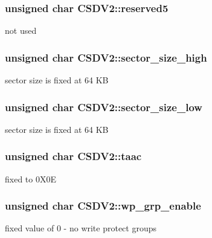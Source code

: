 \subsubsection[{\texorpdfstring{reserved5}{reserved5}}]{\setlength{\rightskip}{0pt plus 5cm}unsigned char C\+S\+D\+V2\+::reserved5}\hypertarget{struct_c_s_d_v2_acb8d47b0517908d08d12f0d8f3b2cc74}{}\label{struct_c_s_d_v2_acb8d47b0517908d08d12f0d8f3b2cc74}
not used 
\subsubsection[{\texorpdfstring{sector\+\_\+size\+\_\+high}{sector_size_high}}]{\setlength{\rightskip}{0pt plus 5cm}unsigned char C\+S\+D\+V2\+::sector\+\_\+size\+\_\+high}\hypertarget{struct_c_s_d_v2_a09c942079f7d4e1a26d26d4cfe9d15c5}{}\label{struct_c_s_d_v2_a09c942079f7d4e1a26d26d4cfe9d15c5}
sector size is fixed at 64 KB 
\subsubsection[{\texorpdfstring{sector\+\_\+size\+\_\+low}{sector_size_low}}]{\setlength{\rightskip}{0pt plus 5cm}unsigned char C\+S\+D\+V2\+::sector\+\_\+size\+\_\+low}\hypertarget{struct_c_s_d_v2_acd516f06ea0b926fa1580034a6efb9c6}{}\label{struct_c_s_d_v2_acd516f06ea0b926fa1580034a6efb9c6}
sector size is fixed at 64 KB 
\subsubsection[{\texorpdfstring{taac}{taac}}]{\setlength{\rightskip}{0pt plus 5cm}unsigned char C\+S\+D\+V2\+::taac}\hypertarget{struct_c_s_d_v2_aba414a2887ea57a9715e17b3bb4f6030}{}\label{struct_c_s_d_v2_aba414a2887ea57a9715e17b3bb4f6030}
fixed to 0\+X0E 
\subsubsection[{\texorpdfstring{wp\+\_\+grp\+\_\+enable}{wp_grp_enable}}]{\setlength{\rightskip}{0pt plus 5cm}unsigned char C\+S\+D\+V2\+::wp\+\_\+grp\+\_\+enable}\hypertarget{struct_c_s_d_v2_a98cf0c80369604ba372c22a0453f9e76}{}\label{struct_c_s_d_v2_a98cf0c80369604ba372c22a0453f9e76}
fixed value of 0 -\/ no write protect groups 
